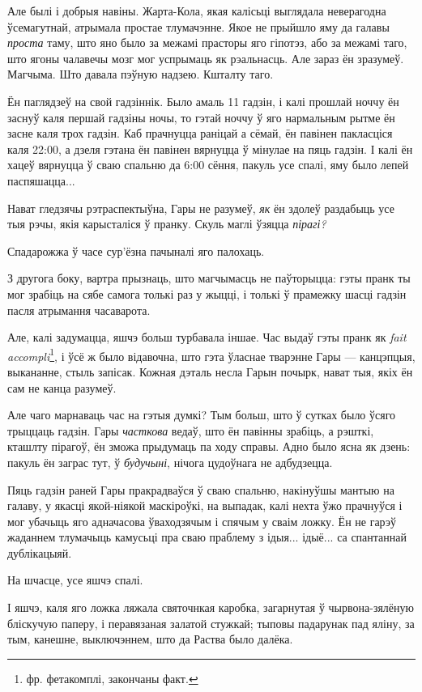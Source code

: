 Але былі і добрыя навіны. Жарта-Кола, якая калісьці выглядала неверагодна ўсемагутнай,
атрымала простае тлумачэнне. Якое не прыйшло яму да галавы \emph{проста} 
таму, што яно было за межамі прасторы яго гіпотэз, або за межамі 
таго, што ягоны чалавечы мозг мог успрымаць як рэальнасць. Але зараз ён 
зразумеў. Магчыма. Што давала пэўную надзею. Кшталту таго.

Ён паглядзеў на свой гадзіннік. Было амаль 11 гадзін, і калі прошлай ноччу ён 
заснуў каля першай гадзіны ночы, то гэтай ноччу ў яго нармальным рытме ён 
засне каля трох гадзін. Каб прачнуцца раніцай а сёмай, ён павінен пакласціся каля 22:00,
а дзеля гэтана ён павінен вярнуцца ў мінулае на пяць гадзін. І калі ён хацеў 
вярнуцца ў сваю спальню да 6:00 сёння, пакуль усе спалі, яму было лепей 
паспяшацца...

Нават гледзячы рэтраспектыўна, Гары не разумеў, \emph{як} ён здолеў раздабыць усе 
тыя рэчы, якія карысталіся ў пранку. Скуль маглі ўзяцца \emph{пірагі?}

Спадарожжа ў часе сур'ёзна пачыналі яго палохаць.

З другога боку, вартра прызнаць, што магчымасць не паўторыцца: 
гэты пранк ты мог зрабіць на сябе самога толькі раз у жыцці, і толькі ў прамежку шасці гадзін
пасля атрымання часаварота.

Але, калі задумацца, яшчэ больш турбавала іншае. Час выдаў гэты пранк як 
\emph{fait accompli}\footnote{{} фр. фетакомплі, закончаны факт.}, і ўсё ж было відавочна,
што гэта ўласнае тварэнне Гары --- канцэпцыя, выкананне, стыль запісак. 
Кожная дэталь несла Гарын почырк, нават тыя, якіх ён сам не канца разумеў.

Але чаго марнаваць час на гэтыя думкі? Тым больш, што ў сутках было ўсяго трыццаць гадзін.
Гары \emph{часткова} ведаў, што ён павінны зрабіць, а рэшткі, кташлту пірагоў, ён 
зможа прыдумаць па ходу справы. Адно было ясна як дзень:
пакуль ён заграс тут, ў \emph{будучыні}, нічога цудоўнага не адбудзецца.


\later

Пяць гадзін раней Гары пракрадваўся ў сваю спальню, накінуўшы мантыю на галаву, у 
якасці якой-ніякой маскіроўкі, на выпадак, калі нехта ўжо прачнуўся і мог убачыць 
яго адначасова ўваходзячым і спячым у сваім ложку. Ён не гарэў жаданнем 
тлумачыць камусьці пра сваю праблему з ідыя... ідыё... са спантаннай дублікацыяй.

На шчасце, усе яшчэ спалі.

І яшчэ, каля яго ложка ляжала святочнкая каробка, загарнутая ў чырвона-зялёную
бліскучую паперу, і перавязаная залатой стужкай; тыповы падарунак пад яліну, за 
тым, канешне, выключэннем, што да Раства было далёка.

